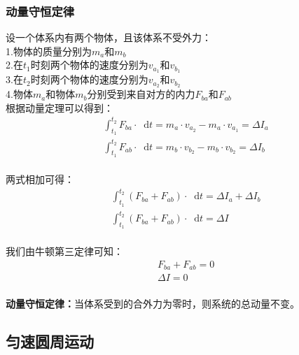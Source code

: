 \documentclass[UTF8]{ctexart}
\newcommand*{\dif}{\mathop{}\!\mathrm{d}}
\begin{document}
\subsubsection{动量守恒定律}
    设一个体系内有两个物体，且该体系不受外力：\\[3mm]
    1.物体的质量分别为$m_a$和$m_b$\\[2mm]
    2.在$t_1$时刻两个物体的速度分别为$v_{a_1}$和$v_{b_1}$\\[2mm]
    3.在$t_2$时刻两个物体的速度分别为$v_{a_2}$和$v_{b_2}$\\[2mm]
    4.物体$m_a$和物体$m_b$分别受到来自对方的内力$F_{ba}$和$F_{ab}$\\[4mm]
    根据动量定理可以得到：
    \setcounter{equation}{0}
    \begin{align}
        &\int_{t_1}^{t_2}F_{ba}\cdot \dif t=m_a\cdot v_{a_2}-m_a\cdot v_{a_1}=\Delta I_a\\[4mm]
        &\int_{t_1}^{t_2}F_{ab}\cdot \dif t=m_b\cdot v_{b_2}-m_b\cdot v_{b_2}=\Delta I_b
    \end{align}\\
    两式相加可得：
    \begin{align}
        &\int_{t_1}^{t_2}\left(F_{ba}+F_{ab}\right)\cdot\dif t=\Delta I_a+\Delta I_b\\[4mm]
        &\int_{t_1}^{t_2}\left(F_{ba}+F_{ab}\right)\cdot\dif t=\Delta I
    \end{align}\\
    我们由牛顿第三定律可知：
    \begin{align}
        &F_{ba}+F_{ab}=0\\[3mm]
        &\Delta I=0
    \end{align}\\
    \textbf{动量守恒定律：}当体系受到的合外力为零时，则系统的总动量不变。

\newpage

\subsection{匀速圆周运动}
\end{document}
